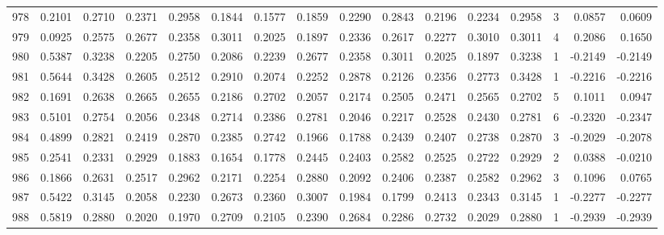 \begin{tabular}{lrrrrrrrrrrrrrrr}
978 &      0.2101 &  0.2710 &  0.2371 &  0.2958 &  0.1844 &  0.1577 &  0.1859 &  0.2290 &  0.2843 &  0.2196 &   0.2234 &     0.2958 &      3 &                    0.0857 &                     0.0609 \\
979 &      0.0925 &  0.2575 &  0.2677 &  0.2358 &  0.3011 &  0.2025 &  0.1897 &  0.2336 &  0.2617 &  0.2277 &   0.3010 &     0.3011 &      4 &                    0.2086 &                     0.1650 \\
980 &      0.5387 &  0.3238 &  0.2205 &  0.2750 &  0.2086 &  0.2239 &  0.2677 &  0.2358 &  0.3011 &  0.2025 &   0.1897 &     0.3238 &      1 &                   -0.2149 &                    -0.2149 \\
981 &      0.5644 &  0.3428 &  0.2605 &  0.2512 &  0.2910 &  0.2074 &  0.2252 &  0.2878 &  0.2126 &  0.2356 &   0.2773 &     0.3428 &      1 &                   -0.2216 &                    -0.2216 \\
982 &      0.1691 &  0.2638 &  0.2665 &  0.2655 &  0.2186 &  0.2702 &  0.2057 &  0.2174 &  0.2505 &  0.2471 &   0.2565 &     0.2702 &      5 &                    0.1011 &                     0.0947 \\
983 &      0.5101 &  0.2754 &  0.2056 &  0.2348 &  0.2714 &  0.2386 &  0.2781 &  0.2046 &  0.2217 &  0.2528 &   0.2430 &     0.2781 &      6 &                   -0.2320 &                    -0.2347 \\
984 &      0.4899 &  0.2821 &  0.2419 &  0.2870 &  0.2385 &  0.2742 &  0.1966 &  0.1788 &  0.2439 &  0.2407 &   0.2738 &     0.2870 &      3 &                   -0.2029 &                    -0.2078 \\
985 &      0.2541 &  0.2331 &  0.2929 &  0.1883 &  0.1654 &  0.1778 &  0.2445 &  0.2403 &  0.2582 &  0.2525 &   0.2722 &     0.2929 &      2 &                    0.0388 &                    -0.0210 \\
986 &      0.1866 &  0.2631 &  0.2517 &  0.2962 &  0.2171 &  0.2254 &  0.2880 &  0.2092 &  0.2406 &  0.2387 &   0.2582 &     0.2962 &      3 &                    0.1096 &                     0.0765 \\
987 &      0.5422 &  0.3145 &  0.2058 &  0.2230 &  0.2673 &  0.2360 &  0.3007 &  0.1984 &  0.1799 &  0.2413 &   0.2343 &     0.3145 &      1 &                   -0.2277 &                    -0.2277 \\
988 &      0.5819 &  0.2880 &  0.2020 &  0.1970 &  0.2709 &  0.2105 &  0.2390 &  0.2684 &  0.2286 &  0.2732 &   0.2029 &     0.2880 &      1 &                   -0.2939 &                    -0.2939 \\

\end{tabular}
